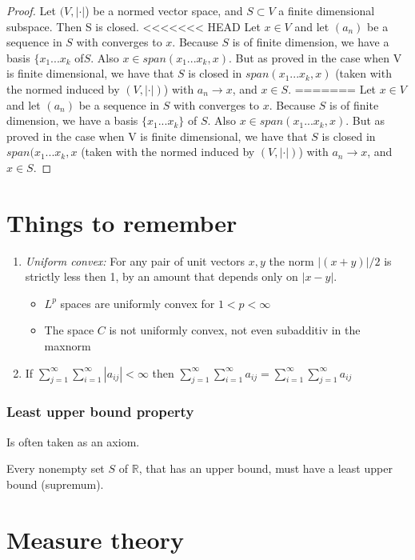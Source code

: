 \documentclass[titlepage]{article}
\begin{document}
\begin{proof}
Let $(V, |\cdot|$) be a normed vector space, and $S\subset V$ a finite dimensional subspace. Then S is closed.
<<<<<<< HEAD
Let $x\in V$ and let $(a_n)$ be a sequence in $S$ with converges to $x$. Because $S$ is of finite dimension, we have a basis $\{x_1...x_k$ of$S$. Also $x\in span(x_1...x_k,x)$. But as proved in the case when V is finite dimensional, we have that $S$ is closed in $span(x_1...x_k,x)$ (taken with the normed induced by $(V, |\cdot|)$) with $a_n \rightarrow x$, and $x\in S$.
=======
Let $x\in V$ and let $(a_n)$ be a sequence in $S$ with converges to $x$. Because $S$ is of finite dimension, we have a basis $\{x_1...x_k\}$ of $S$. Also $x\in span(x_1...x_k,x)$. But as proved in the case when V is finite dimensional, we have that $S$ is closed in $span(x_1...x_k,x$ (taken with the normed induced by $(V, |\cdot|)$) with $a_n \rightarrow x$, and $x\in S$.

\end{proof}
\section{Things to remember}
\begin{enumerate}
\item \textit{Uniform convex:} For any pair of unit vectors $x,y$ the norm $|(x+y)|/2$ is strictly less then 1, by an amount that depends only on $|x-y|$.
   \begin{itemize}
        \item $L^p$ spaces are uniformly convex for $1<p<\infty$
        \item The space $C$ is not uniformly convex, not even subadditiv in the maxnorm
    \end{itemize}
    \item If $\sum_{j = 1}^\infty \sum_{i = 1}^\infty |a_{ij}| < \infty $ then  $\sum_{j = 1}^\infty \sum_{i = 1}^\infty a_{ij}  = \sum_{i = 1}^\infty \sum_{j = 1}^\infty a_{ij}$ 
\end{enumerate}


\subsubsection{Least upper bound property}
Is often taken as an axiom.

Every nonempty set $S$ of $\mathbb{R}$, that has an upper bound, must have a least upper bound (supremum).
\section{Measure theory}
\end{document}
